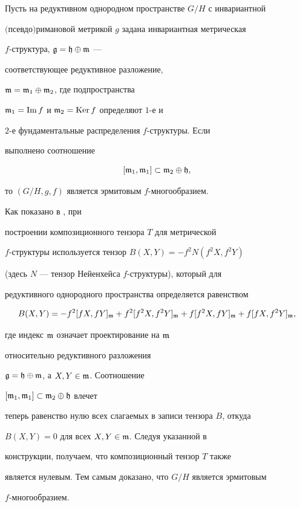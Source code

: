 \begin{thm}\label{T3}


Пусть на редуктивном однородном пространстве $G/H$ с инвариантной


$($псев\-до$)$ри\-ма\-новой метрикой $g$ задана инвариантная метрическая


$f$-структура, $\frak{g}=\frak{h}\oplus\frak{m}$ ---


соответствующее редуктивное разложение,


$\frak{m}=\frak{m}_1\oplus\frak{m}_2$, где подпространства


$\frak{m}_1=\operatorname{Im} f$ и $\frak{m}_2=\operatorname{Ker} f$ определяют $1$-е и


$2$-е фундаментальные распределения $f$-структуры. Если


выполнено соотношение


\begin{equation}\label{subset}


[\frak{m}_1,\frak{m}_1]\subset \frak{m}_2\oplus\frak{h},


\end{equation}


то $(G/H,g,f)$ является эрмитовым $f$-многообразием.


\end{thm}





\begin{pf}


Как показано в \cite{4}, при


построении композиционного тензора $T$ для метрической


$f$-структуры используется тензор $B(X,Y)= -f^2N(f^2X,f^2Y)$


(здесь $N$ --- тензор Нейенхейса $f$-структуры), который для


редуктивного однородного пространства определяется равенством


$$


B(X,Y)= -f^2[fX,fY]_{\frak{m}}+


f^2[f^2X,f^2Y]_{\frak{m}}+f[f^2X,fY]_{\frak{m}}+f[fX,f^2Y]_{\frak{m}},


$$


где индекс $\frak{m}$ означает проектирование на $\frak{m}$


относительно редуктивного разложения


$\frak{g}=\frak{h}\oplus\frak{m}$, а $X,Y\in\frak{m}$. Соотношение


$[\frak{m}_1,\frak{m}_1] \subset \frak{m}_2\oplus\frak{h}$ влечет


теперь равенство нулю всех слагаемых в записи тензора $B$, откуда


$B(X,Y)=0$ для всех $X,Y\in \frak{m}$. Следуя указанной в \cite{4}


конструкции, получаем, что композиционный тензор $T$ также


является нулевым. Тем самым доказано, что $G/H$ является эрмитовым


$f$-многообразием.


\end{pf}





